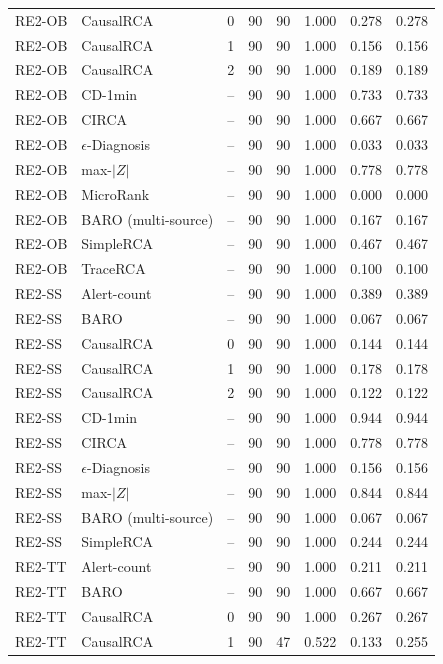{\begin{longtable}{llrrrrrr}
RE2-OB & CausalRCA & 0 & 90 & 90 & 1.000 & 0.278 & 0.278 \\
RE2-OB & CausalRCA & 1 & 90 & 90 & 1.000 & 0.156 & 0.156 \\
RE2-OB & CausalRCA & 2 & 90 & 90 & 1.000 & 0.189 & 0.189 \\
RE2-OB & CD-1min & -- & 90 & 90 & 1.000 & 0.733 & 0.733 \\
RE2-OB & CIRCA & -- & 90 & 90 & 1.000 & 0.667 & 0.667 \\
RE2-OB & $\epsilon$-Diagnosis & -- & 90 & 90 & 1.000 & 0.033 & 0.033 \\
RE2-OB & max-$|Z|$ & -- & 90 & 90 & 1.000 & 0.778 & 0.778 \\
RE2-OB & MicroRank & -- & 90 & 90 & 1.000 & 0.000 & 0.000 \\
RE2-OB & BARO (multi-source) & -- & 90 & 90 & 1.000 & 0.167 & 0.167 \\
RE2-OB & SimpleRCA & -- & 90 & 90 & 1.000 & 0.467 & 0.467 \\
RE2-OB & TraceRCA & -- & 90 & 90 & 1.000 & 0.100 & 0.100 \\
RE2-SS & Alert-count & -- & 90 & 90 & 1.000 & 0.389 & 0.389 \\
RE2-SS & BARO & -- & 90 & 90 & 1.000 & 0.067 & 0.067 \\
RE2-SS & CausalRCA & 0 & 90 & 90 & 1.000 & 0.144 & 0.144 \\
RE2-SS & CausalRCA & 1 & 90 & 90 & 1.000 & 0.178 & 0.178 \\
RE2-SS & CausalRCA & 2 & 90 & 90 & 1.000 & 0.122 & 0.122 \\
RE2-SS & CD-1min & -- & 90 & 90 & 1.000 & 0.944 & 0.944 \\
RE2-SS & CIRCA & -- & 90 & 90 & 1.000 & 0.778 & 0.778 \\
RE2-SS & $\epsilon$-Diagnosis & -- & 90 & 90 & 1.000 & 0.156 & 0.156 \\
RE2-SS & max-$|Z|$ & -- & 90 & 90 & 1.000 & 0.844 & 0.844 \\
RE2-SS & BARO (multi-source) & -- & 90 & 90 & 1.000 & 0.067 & 0.067 \\
RE2-SS & SimpleRCA & -- & 90 & 90 & 1.000 & 0.244 & 0.244 \\
RE2-TT & Alert-count & -- & 90 & 90 & 1.000 & 0.211 & 0.211 \\
RE2-TT & BARO & -- & 90 & 90 & 1.000 & 0.667 & 0.667 \\
RE2-TT & CausalRCA & 0 & 90 & 90 & 1.000 & 0.267 & 0.267 \\
RE2-TT & CausalRCA & 1 & 90 & 47 & 0.522 & 0.133 & 0.255 \\

\end{longtable}}
